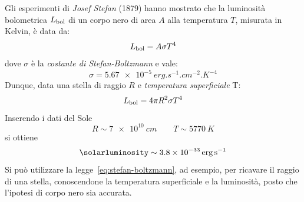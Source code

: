 Gli esperimenti di \emph{Josef Stefan} (1879) hanno mostrato che la luminosità bolometrica $L_\textup{bol}$ di un corpo nero di area $A$ alla temperatura $T$, misurata in Kelvin, è data da:
\[
    L_\textup{bol} = A \sigma T^4
\]
dove $\sigma$ è la \emph{costante di Stefan-Boltzmann} e vale:
\[
    \sigma = \SI{5.67e-5}{erg.s^{-1}.cm^{-2}.K^{-4}}
\]
Dunque, data una stella di raggio $R$ e \emph{temperatura superficiale} T:
\begin{equation}\label{eq:stefan-boltzmann}
    L_\textup{bol} = 4 \pi R^2 \sigma T^4
\end{equation}
Inserendo i dati del Sole
\[
    R \sim \SI{7e10}{cm} \qquad T \sim \SI{5770}{K}
\]
si ottiene
\[
    \si{\solarluminosity} \sim \SI{3.8e-33}{erg.s^{-1}}
\]
Si può utilizzare la legge~\eqref{eq:stefan-boltzmann}, ad esempio, per ricavare il raggio di una stella, conoscendone la temperatura superficiale e la luminosità, posto che l'ipotesi di corpo nero sia accurata.